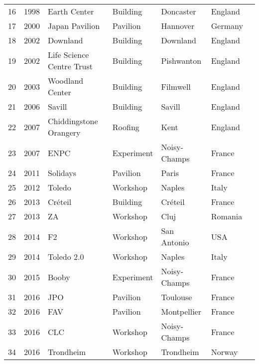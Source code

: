 {{{\begin{tabularx}{\textwidth}{@{}llXlllr@{}}
					16 & 1998 & Earth Center & Building & Doncaster & England & \\
					17 & 2000 & Japan Pavilion & Pavilion & Hannover & Germany & \cite{Ban2006}\\
					18 & 2002 & Downland & Building & Downland & England & \cite{Harris2003}\\
					19 & 2002 & Life Science Centre Trust & Building & Pishwanton & England & \\
					20 & 2003 & Woodland Center & Building & Filmwell & England & \\
					21 & 2006 & Savill & Building & Savill & England & \cite{Harris2008}\\
					22 & 2007 & Chiddingstone Orangery & Roofing & Kent & England & \\
					23 & 2007 & ENPC & Experiment & Noisy-Champs & France & \cite{Douthe2006}\\
					24 & 2011 & Solidays & Pavilion & Paris & France & \cite{Baverel2012}\\
					25 & 2012 & Toledo & Workshop & Naples & Italy & \cite{DAmico2014}\\
					26 & 2013 & Créteil & Building & Créteil & France & \cite{DuPeloux2016}\\
					27 & 2013 & ZA & Workshop & Cluj & Romania & \\
					28 & 2014 & F2 & Workshop & San Antonio & USA & \\
					29 & 2014 & Toledo 2.0 & Workshop & Naples & Italy & \cite{DAmico2015a}\\
					30 & 2015 & Booby & Experiment & Noisy-Champs & France & \cite{Cuvilliers2017}\\
					31 & 2016 & JPO & Pavilion & Toulouse & France & \\
					32 & 2016 & FAV & Pavilion & Montpellier & France & \\
					33 & 2016 & CLC & Workshop & Noisy-Champs & France & \\
					34 & 2016 & Trondheim & Workshop & Trondheim & Norway & \cite{Mork2016}\\
					\bottomrule
						 \end{tabularx}}
	}
}

